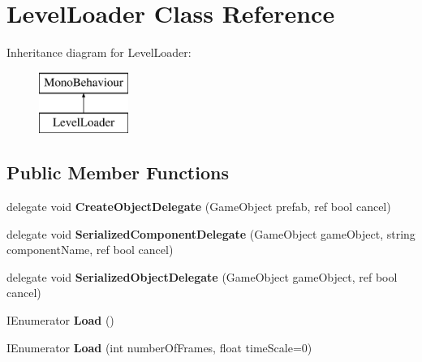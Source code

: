 \hypertarget{class_level_loader}{}\section{Level\+Loader Class Reference}
\label{class_level_loader}
Inheritance diagram for Level\+Loader\+:\begin{figure}[H]
\begin{center}
\leavevmode
\includegraphics[height=2.000000cm]{class_level_loader}
\end{center}
\end{figure}
\subsection*{Public Member Functions}
\begin{DoxyCompactItemize}
\item 
\mbox{\label{class_level_loader_a251c136aac0e65fff5fef1c339fad356}} 
delegate void {\bfseries Create\+Object\+Delegate} (Game\+Object prefab, ref bool cancel)
\item 
\mbox{\label{class_level_loader_a233f68062303e5e0876c93646a9215ba}} 
delegate void {\bfseries Serialized\+Component\+Delegate} (Game\+Object game\+Object, string component\+Name, ref bool cancel)
\item 
\mbox{\label{class_level_loader_a4483f031503dac772decbd9beedd784a}} 
delegate void {\bfseries Serialized\+Object\+Delegate} (Game\+Object game\+Object, ref bool cancel)
\item 
\mbox{\label{class_level_loader_a9db9397a70b0263acaa645576258777b}} 
I\+Enumerator {\bfseries Load} ()
\item 
\mbox{\label{class_level_loader_a4803ecbc9f8daab6e5a5e09bf7bf8911}} 
I\+Enumerator {\bfseries Load} (int number\+Of\+Frames, float time\+Scale=0)
\end{DoxyCompactItemize}
